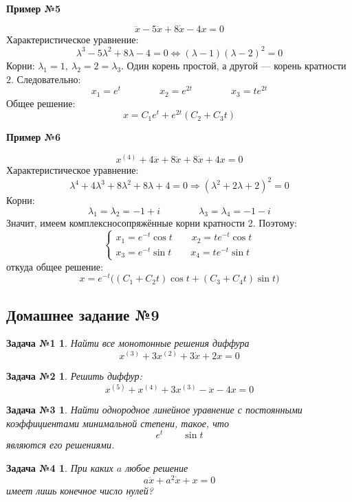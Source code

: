 \documentclass[a4paper,12pt]{article}
\newtheorem*{task1}{Задача №1}
\newtheorem*{task2}{Задача №2}
\newtheorem*{task3}{Задача №3}
\newtheorem*{task4}{Задача №4}
\newcommand{\dx}{\dot{x}}
\newcommand{\ddx}{\ddot{x}}
\newcommand{\dddx}{\dddot{x}}
\newcommand{\bto}{\Longrightarrow}
\begin{document}
\textbf{Пример №5}

\[\dddx -5\ddx + 8\dx - 4x = 0\]
Характеристическое уравнение:
\[\lambda^3 - 5\lambda^2 + 8\lambda - 4 = 0 \iff (\lambda - 1)(\lambda - 2)^2 = 0\]
Корни: $\lambda_1 = 1,\ \lambda_2 = 2 = \lambda_3$.
Один корень простой, а другой --- корень кратности $2$.
Следовательно:
\[x_1 = e^t\qquad \qquad x_2 = e^{2t}\qquad \qquad x_3 = te^{2t}\]
Общее решение:
\[x = C_1e^t + e^{2t}(C_2 + C_3t)\]

\textbf{Пример №6}

\[x^{(4)} + 4\dddx + 8\ddx + 8\dx + 4x = 0\]
Характеристическое уравнение:
\[\lambda^4 + 4\lambda^3 + 8\lambda^2 + 8\lambda + 4 = 0 \bto (\lambda^2 + 2\lambda + 2)^2 = 0\]
Корни:
\[\lambda_1 = \lambda_2 = - 1 + i \qquad \qquad \lambda_3 = \lambda_4 = - 1 - i\]
Значит, имеем комплексносопряжённые корни кратности 2. Поэтому:
\[\begin{cases}
	x_1 = e^{-t}\cos t \qquad x_2 = te^{-t}\cos t\\
	x_3 = e^{-t}\sin t \qquad x_4 = te^{-t}\sin t
\end{cases}\]
откуда общее решение:
\[x = e^{-t}\Big((C_1 + C_2t)\cos t + (C_3 + C_4t)\sin t\Big)\]

\subsection{Домашнее задание №9}


\begin{task1}
	Найти все монотонные решения диффура
	\[x^{(3)} + 3x^{(2)} + 3\dx + 2x = 0\]
\end{task1}
%

\begin{task2}
	Решить диффур:
	\[x^{(5)} + x^{(4)} + 3x^{(3)} - \ddx - 4x = 0\]
\end{task2}
%

\begin{task3}
	Найти однородное линейное уравнение с постоянными коэффициентами минимальной степени, такое, что 
	\[e^t\qquad\sin t\] являются его решениями.
\end{task3}
%	

\begin{task4}
	При каких $a$ любое решение 
	\[a\ddx + a^2\dx + x = 0\] имеет лишь конечное число нулей?
\end{task4}
%
\end{document}
